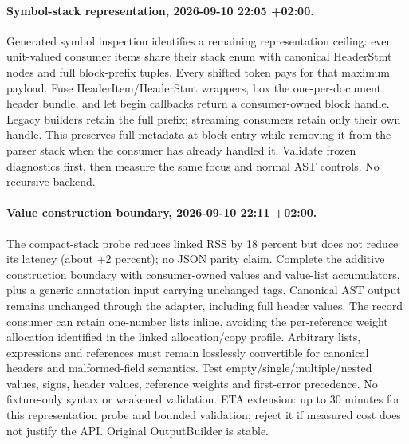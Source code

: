 \documentclass[11pt,a4paper]{article}
\begin{document}
\paragraph{Symbol-stack representation, 2026-09-10 22:05 +02:00.}
Generated symbol inspection identifies a remaining representation ceiling: even
unit-valued consumer items share their stack enum with canonical HeaderStmt nodes
and full block-prefix tuples. Every shifted token pays for that maximum payload.
Fuse HeaderItem/HeaderStmt wrappers, box the one-per-document header bundle,
and let begin callbacks return a consumer-owned block handle. Legacy builders
retain the full prefix; streaming consumers retain only their own handle. This
preserves full metadata at block entry while removing it from the parser stack
when the consumer has already handled it. Validate frozen diagnostics first,
then measure the same focus and normal AST controls. No recursive backend.

\paragraph{Value construction boundary, 2026-09-10 22:11 +02:00.}
The compact-stack probe reduces linked RSS by 18 percent but does not reduce its
latency (about +2 percent); no JSON parity claim. Complete the additive construction
boundary with consumer-owned values and value-list accumulators, plus a generic
annotation input carrying unchanged tags. Canonical AST output remains unchanged
through the adapter, including full header values. The record consumer can retain
one-number lists inline, avoiding the per-reference weight allocation identified
in the linked allocation/copy profile. Arbitrary lists, expressions and references
must remain losslessly convertible for canonical headers and malformed-field
semantics. Test empty/single/multiple/nested values, signs, header values, reference
weights and first-error precedence. No fixture-only syntax or weakened validation.
ETA extension: up to 30 minutes for this representation probe and bounded validation;
reject it if measured cost does not justify the API. Original OutputBuilder is stable.
\end{document}
